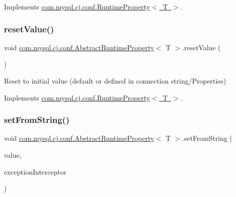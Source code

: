 Implements \mbox{\hyperlink{interfacecom_1_1mysql_1_1cj_1_1conf_1_1_runtime_property_a171f2224114d716cb6dfcf1dabcf4092}{com.\+mysql.\+cj.\+conf.\+Runtime\+Property$<$ T $>$}}.

\mbox{\label{classcom_1_1mysql_1_1cj_1_1conf_1_1_abstract_runtime_property_af8d93196b5571652a430ae751df642f9}} 
\subsubsection{\texorpdfstring{reset\+Value()}{resetValue()}}
{\footnotesize\ttfamily void \mbox{\hyperlink{classcom_1_1mysql_1_1cj_1_1conf_1_1_abstract_runtime_property}{com.\+mysql.\+cj.\+conf.\+Abstract\+Runtime\+Property}}$<$ T $>$.reset\+Value (\begin{DoxyParamCaption}{ }\end{DoxyParamCaption})}

Reset to initial value (default or defined in connection string/\+Properties) 

Implements \mbox{\hyperlink{interfacecom_1_1mysql_1_1cj_1_1conf_1_1_runtime_property_adad737e212723fc3f3da903259377a25}{com.\+mysql.\+cj.\+conf.\+Runtime\+Property$<$ T $>$}}.

\mbox{\label{classcom_1_1mysql_1_1cj_1_1conf_1_1_abstract_runtime_property_a06e57f3969b0cacb8b4e58888c79c18f}} 
\subsubsection{\texorpdfstring{set\+From\+String()}{setFromString()}}
{\footnotesize\ttfamily void \mbox{\hyperlink{classcom_1_1mysql_1_1cj_1_1conf_1_1_abstract_runtime_property}{com.\+mysql.\+cj.\+conf.\+Abstract\+Runtime\+Property}}$<$ T $>$.set\+From\+String (\begin{DoxyParamCaption}\item[{String}]{value,  }\item[{\mbox{\hyperlink{interfacecom_1_1mysql_1_1cj_1_1exceptions_1_1_exception_interceptor}{Exception\+Interceptor}}}]{exception\+Interceptor }\end{DoxyParamCaption})}



